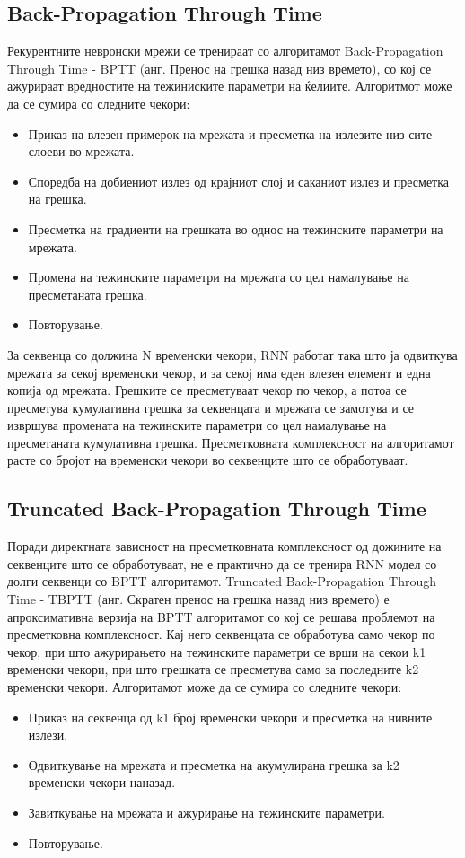 \subsection{Back-Propagation Through Time}
Рекурентните невронски мрежи се тренираат со алгоритамот Back-Propagation Through Time - BPTT (анг. Пренос на грешка назад низ времето), со кој се ажурираат вредностите на тежиниските параметри на ќелиите. Алгоритмот може да се сумира со следните чекори:
\begin{itemize}
    \item Приказ на влезен примерок на мрежата и пресметка на излезите низ сите слоеви во мрежата.
    \item Споредба на добиениот излез од крајниот слој и саканиот излез и пресметка на грешка.
    \item Пресметка на градиенти на грешката во однос на тежинските параметри на мрежата.
    \item Промена на тежинските параметри на мрежата со цел намалување на пресметаната грешка.
    \item Повторување.
\end{itemize}

За секвенца со должина N временски чекори, RNN работат така што ја одвиткува мрежата за секој временски чекор, и за секој има еден влезен елемент и една копија од мрежата. Грешките се пресметуваат чекор по чекор, а потоа се пресметува кумулативна грешка за секвенцата и мрежата се замотува и се извршува промената на тежинските параметри со цел намалување на пресметаната кумулативна грешка. Пресметковната комплексност на алгоритамот расте со бројот на временски чекори во секвенците што се обработуваат. 

\subsection{Truncated Back-Propagation Through Time}

Поради директната зависност на пресметковната комплексност од дожините на секвенците што се обработуваат, не е практично да се тренира RNN модел со долги секвенци со BPTT алгоритамот. Truncated Back-Propagation Through Time - TBPTT (анг. Скратен пренос на грешка назад низ времето) е апроксимативна верзија на BPTT алгоритамот со кој се решава проблемот на пресметковна комплексност. Кај него секвенцата се обработува само чекор по чекор, при што ажурирањето на тежинските параметри се врши на секои k1 временски чекори, при што грешката се пресметува само за последните k2 временски чекори. Алгоритамот може да се сумира со следните чекори:
\begin{itemize}
    \item Приказ на секвенца од k1 број временски чекори и пресметка на нивните излези.
    \item Одвиткување на мрежата и пресметка на акумулирана грешка за k2 временски чекори наназад.
    \item Завиткување на мрежата и ажурирање на тежинските параметри.
    \item Повторување.
\end{itemize}

